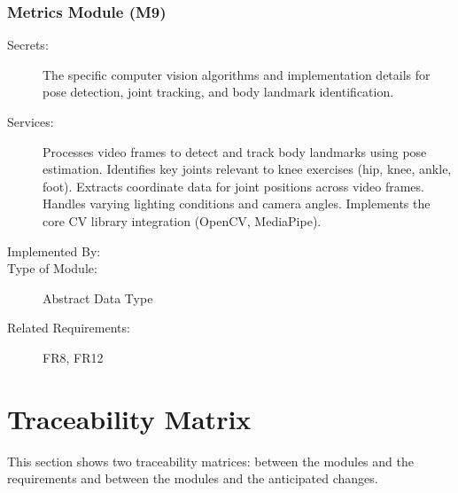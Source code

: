 \documentclass[12pt, titlepage]{article}
\begin{document}
\subsubsection{Metrics Module (M9)}
\begin{description}
	\item[Secrets:] The specific computer vision algorithms and implementation details for pose detection, joint tracking, and body landmark identification.
	\item[Services:] Processes video frames to detect and track body landmarks using pose estimation. Identifies key joints relevant to knee exercises (hip, knee, ankle, foot). Extracts coordinate data for joint positions across video frames. Handles varying lighting conditions and camera angles. Implements the core CV library integration (OpenCV, MediaPipe).
	\item[Implemented By:] \progname{}
	\item[Type of Module:] Abstract Data Type
	\item[Related Requirements:] FR8, FR12
\end{description}





\section{Traceability Matrix} \label{SecTM}

This section shows two traceability matrices: between the modules and the
requirements and between the modules and the anticipated changes.
\end{document}
